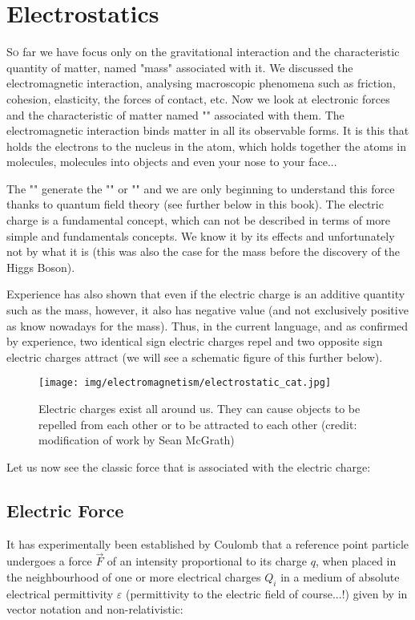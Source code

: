 	\newpage
	\thispagestyle{empty}
	\mbox{}	
	\section{Electrostatics}
	\lettrine[lines=4]{\color{BrickRed}S}o far we have focus only on the gravitational interaction and the characteristic quantity of matter, named "mass" associated with it. We discussed the electromagnetic interaction, analysing macroscopic phenomena such as friction, cohesion, elasticity, the forces of contact, etc. Now we look at electronic forces and the characteristic of matter named "" associated with them. The electromagnetic interaction binds matter in all its observable forms. It is this that holds the electrons to the nucleus in the atom, which holds together the atoms in molecules, molecules into objects and even your nose to your face...
	
	The "" generate the "" or "\label{coulomb force}" and we are only beginning to understand this force thanks to quantum field theory (see further below in this book). The electric charge is a fundamental concept, which can not be described in terms of more simple and fundamentals concepts. We know it by its effects and unfortunately not by what it is (this was also the case for the mass before the discovery of the Higgs Boson).
	
	Experience has also shown that even if the electric charge is an additive quantity such as the mass, however, it also has negative value (and not exclusively positive as know nowadays for the mass). Thus, in the current language, and as confirmed by experience, two identical sign electric charges repel and two opposite sign electric charges attract (we will see a schematic figure of this further below).
	\begin{figure}[H]
		\centering
		\texttt{[image: img/electromagnetism/electrostatic\_cat.jpg]}
		\caption[]{Electric charges exist all around us. They can cause objects to be repelled from each other or to be attracted to each other (credit: modification of work by Sean McGrath)}
	\end{figure}
	Let us now see the classic force that is associated with the electric charge:
	
	\subsection{Electric Force}\label{electric force}
	It has experimentally been established by Coulomb that a reference point particle undergoes a force $\vec{F}$ of an intensity proportional to its charge $q$, when placed in the neighbourhood of one or more electrical charges $Q_i$ in a medium of absolute electrical permittivity $\varepsilon$ (permittivity to the electric field of course...!) given by in vector notation and non-relativistic:
	

